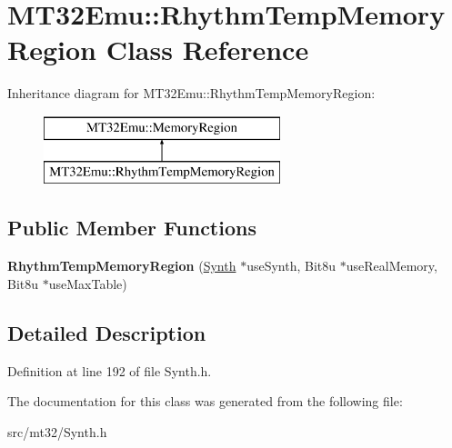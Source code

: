 \hypertarget{classMT32Emu_1_1RhythmTempMemoryRegion}{\section{M\-T32\-Emu\-:\-:Rhythm\-Temp\-Memory\-Region Class Reference}
\label{classMT32Emu_1_1RhythmTempMemoryRegion}
}
Inheritance diagram for M\-T32\-Emu\-:\-:Rhythm\-Temp\-Memory\-Region\-:\begin{figure}[H]
\begin{center}
\leavevmode
\includegraphics[height=2.000000cm]{classMT32Emu_1_1RhythmTempMemoryRegion}
\end{center}
\end{figure}
\subsection*{Public Member Functions}
\begin{DoxyCompactItemize}
\item 
\hypertarget{classMT32Emu_1_1RhythmTempMemoryRegion_a4eb205a9a08b571096f70b6f1a47df6c}{{\bfseries Rhythm\-Temp\-Memory\-Region} (\hyperlink{classMT32Emu_1_1Synth}{Synth} $\ast$use\-Synth, Bit8u $\ast$use\-Real\-Memory, Bit8u $\ast$use\-Max\-Table)}\label{classMT32Emu_1_1RhythmTempMemoryRegion_a4eb205a9a08b571096f70b6f1a47df6c}

\end{DoxyCompactItemize}


\subsection{Detailed Description}


Definition at line 192 of file Synth.\-h.



The documentation for this class was generated from the following file\-:\begin{DoxyCompactItemize}
\item 
src/mt32/Synth.\-h\end{DoxyCompactItemize}
